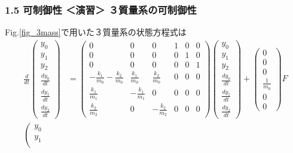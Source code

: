 \documentclass[10pt]{beamer}
\begin{document}
\begin{frame}[t]
\frametitle{1.5 可制御性 ＜演習＞ ３質量系の可制御性}
Fig.\ref{fig_3mass}で用いた３質量系の状態方程式は
\small{
\begin{align}
 \frac{d}{dt} \left(\begin{array}{c}
           y_0 \\
         y_1 \\
         y_2 \\
         \frac{dy_0}{dt} \\
         \frac{dy_1}{dt} \\
         \frac{dy_2}{dt}
        \end{array}\right)
 &=
 \left(\begin{array}{cccccc}
        0 & 0 & 0 & 1 & 0 & 0      \\
        0 & 0 & 0 & 0 & 1 & 0      \\
        0 & 0 & 0 & 0 & 0 & 1      \\
  -\frac{k_1}{m_0} -\frac{k_2}{m_0}&  \frac{k_1}{m_0} &  \frac{k_2}{m_0} & 0 & 0 & 0 \\
   \frac{k_1}{m_1}                & -\frac{k_1}{m_1} &  0               & 0 & 0 & 0 \\
   \frac{k_2}{m_2}                &  0               & -\frac{k_2}{m_2} & 0 & 0 & 0
       \end{array}\right)
 \left(\begin{array}{c}
           y_0 \\
         y_1 \\
         y_2 \\
         \frac{dy_0}{dt} \\
         \frac{dy_1}{dt} \\
         \frac{dy_2}{dt}
       \end{array}\right)
 +
 \left(\begin{array}{c}
        0 \\
        0 \\
        0 \\
      \frac{1}{m_0} \\
      0 \\
      0
       \end{array}\right)
        F
\nonumber
\\
 \left(\begin{array}{c}
      y_0 \\
    y_1 \\

\end{array}
\end{align}}
\end{frame}
\end{document}
